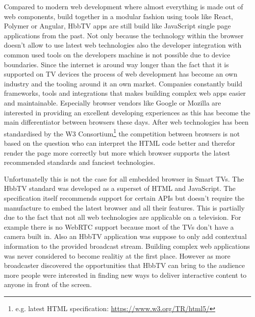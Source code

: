 Compared to modern web development where almost everything is made out of web components, build together in a
modular fashion using tools like React, Polymer or Angular, HbbTV apps are still build like JavaScript single
page applications from the past. Not only because the technology within the browser doesn't allow to use
latest web technologies also the developer integration with common used tools on the developers machine is not
possible due to device boundaries. Since the internet is around way longer than the fact that it is supported on
TV devices the process of web development has become an own industry and the tooling around it an own market.
Companies constantly build frameworks, tools and integrations that makes building complex web apps easier and
maintainable. Especially browser vendors like Google or Mozilla are interested in providing an excellent
developing experiences as this has become the main differentiator between browsers these days. After web
technologies has been standardised by the W3 Consortium\footnote{e.g. latest HTML specification: \url{https://www.w3.org/TR/html5/}}
the competition between browsers is not based on the question who can interpret the HTML code better and therefor
render the page more correctly but more which browser supports the latest recommended standards and fanciest
technologies.

Unfortunatelly this is not the case for all embedded browser in Smart TVs. The HbbTV standard was developed as
a superset of HTML and JavaScript. The specification itself recommends support for certain APIs but doesn't
require the manufacture to embed the latest browser and all their features. This is partially due to the fact
that not all web technologies are applicable on a television. For example there is no WebRTC support because
most of the TVs don't have a camera built in. Also an HbbTV application was suppose to only add contextual
information to the provided broadcast stream. Building complex web applications was never considered to become
realitiy at the first place. However as more broadcaster discovered the opportunities that HbbTV can bring to
the audience more people were interested in finding new ways to deliver interactive content to anyone in
front of the screen.

